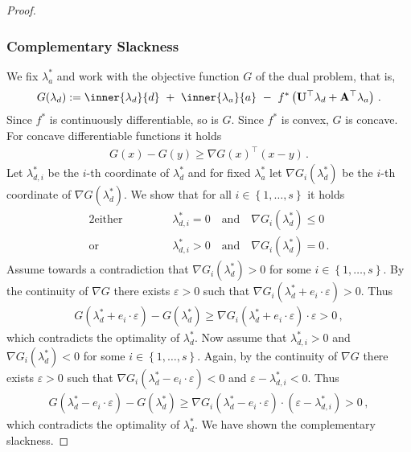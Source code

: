 \begin{proof}
\subsubsection*{Complementary Slackness}
  We fix 
  $
  \lambda_a^*
  $
  and
  work with the objective function $G$ of the dual problem, that is,
  \begin{gather}
    G
(\lambda_d)
:
=
    \inner
    {\lambda_d}
    {d}
    \ 
    +
    \ 
    \inner
    {\lambda_a}
    {a}
    \ 
    -
    \ 
    f^*
    \left( 
      \mathbf{U}^\top  \lambda_d
      +
      \mathbf{A}^\top  \lambda_a
    \right)
    \,.
  \end{gather}
  Since $f^*$ is continuously differentiable, so is $G$. 
  Since $f^*$ is convex, $G$ is concave.
  For concave differentiable functions it holds
  \begin{gather}
    G(x)-G(y)
    \ge
    \nabla
    G(x)^\top
    (x-y)
    \,.
  \end{gather}
Let
$\lambda_{d,i}^*$ be the $i$-th coordinate of $\lambda_d^*$ and for
fixed
$\lambda_a^*$ let
$
\nabla
G_i
(\lambda_d^*)
$
be the $i$-th coordinate of 
$
\nabla
G
(\lambda_d^*)
$.
We show that for all 
$
  i\in \left\{ 1,\ldots, s \right\}
$
it holds
\begin{alignat*}{2}
  \text{either}
  &
  &&
  \qquad
  \lambda_{d,i}^*
  = 0
  \quad
  \text{and}
  \quad
  \nabla
  G
  _i(
  \lambda_{d}^*
  ) \le 0
  \\
  \text{or}
  &
  &&
  \qquad
  \lambda_{d,i}^*
  > 0
  \quad
  \text{and}
  \quad
  \nabla
  G
  _i(
  \lambda_{d}^*
  ) = 0
  \,.
\end{alignat*}
Assume towards a contradiction that 
$
\nabla G_i(\lambda_d^*)>0
$
for some 
$
  i\in \left\{ 1,\ldots, s \right\}
$.
By the continuity of $\nabla G$ there exists $\varepsilon>0$ such that 
$
\nabla G_i(
\lambda_d^*
+
e_i\cdot \varepsilon
)
>
0
$.
Thus
\begin{gather}
  G
  (
\lambda_d^*
+
e_i\cdot \varepsilon
  )
  -
  G
  (
\lambda_d^*
  )
  \ge
\nabla G_i(
\lambda_d^*
+
e_i\cdot \varepsilon
)
\cdot
\varepsilon
>0
\,,
\end{gather}
which contradicts the optimality of 
$
\lambda_d^*
$.
Now assume that
$ \lambda_{d,i}^*>0 $ and 
$
  \nabla G_i(\lambda_d^*)< 0
$
for some
$
  i\in \left\{ 1,\ldots, s \right\}
$.
Again, by the 
continuity of $\nabla G$ there exists $\varepsilon>0$ such that
$
  \nabla G_i(\lambda_d^*-e_i\cdot \varepsilon)< 0
$
and
$
\varepsilon
-
\lambda_{d,i}^*
<0
$.
Thus
\begin{gather}
  G
  (
\lambda_d^*
-
e_i\cdot \varepsilon
  )
  -
  G
  (
\lambda_d^*
  )
  \ge
\nabla G_i(
\lambda_d^*
-
e_i\cdot \varepsilon
)
\cdot
\left( 
\varepsilon
-
\lambda_{d,i}^*
\right)
>0
\,,
\end{gather}
which contradicts the optimality of 
$
\lambda_d^*
$.
We have shown the complementary slackness.

\end{proof}
